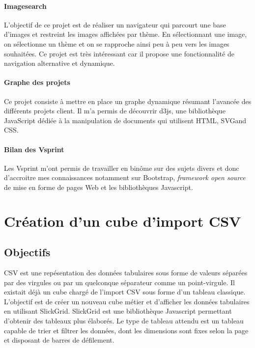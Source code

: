 \documentclass {report}
\begin{document}
\paragraph{Imagesearch}
L'objectif de ce projet est de réaliser un navigateur qui parcourt une base d'images et restreint les images affichées par thème. En sélectionnant une image, on sélectionne un thème et on se rapproche ainsi peu à peu vers les images souhaitées. Ce projet est très intéressant car il propose une fonctionnalité de navigation alternative et dynamique.

\paragraph{Graphe des projets}
Ce projet consiste à mettre en place un graphe dynamique résumant l'avancée des différents projets client. Il m'a permis de découvrir d3js, une bibliothèque JavaScript dédiée à la manipulation de documents qui utilisent HTML, SVG\footnotemark[1] and CSS.
\paragraph{Bilan des Vsprint}
Les Vsprint m'ont permis de travailler en binôme sur des sujets divers et donc d'accroitre mes connaissances notamment sur Bootstrap, \textit{framework open source} de mise en forme de pages Web et les bibliothèques Javascript.



\section{Création d'un cube d'import CSV}
\subsection{Objectifs}
CSV est une repésentation des données tabulaires sous forme de valeurs séparées par des virgules ou par un quelconque séparateur comme un point-virgule. Il existait déjà un cube chargé de l'import CSV sous forme d'un tableau classique. L'objectif est de créer un nouveau cube métier et d'afficher les données tabulaires en utilisant  SlickGrid. SlickGrid est une bibliothèque Javascript permettant d'obtenir des tableaux plus élaborés. Le type de tableau attendu est un tableau capable de trier et filtrer les données, dont les dimensions sont fixes selon la page et disposant de barres de défilement.
\end{document}

